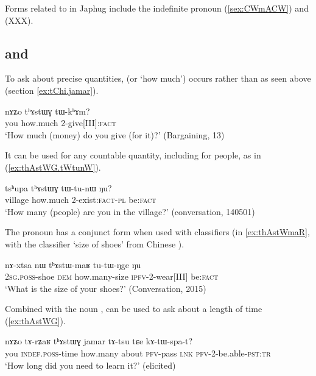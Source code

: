 Forms related to  in Japhug include the indefinite pronoun  (\ref{sex:CWmACW}) and  (XXX).

\subsection{ and } \label{sec:thAstWG}
To ask about precise quantities,  (or `how much') occurs rather than  as seen above (section \ref{ex:tChi.jamar}).

\begin{exe}
\ex \label{ex:thAstWG.tWkhAm}
 \gll    nɤʑo 	tʰɤstɯɣ 	tɯ-kʰɤm?    \\
 you how.much 2-give[III]:\textsc{fact}  \\
\glt  `How much (money) do you give (for it)?' (Bargaining, 13)
\end{exe} 

It can be used for any countable quantity, including for people, as in (\ref{ex:thAstWG.tWtunW}).

\begin{exe}
\ex \label{ex:thAstWG.tWtunW}
 \gll
tsʰupa tʰɤstɯɣ tɯ-tu-nɯ ŋu? \\
village how.much 2-exist:\textsc{fact}-\textsc{pl} be:\textsc{fact} \\
\glt `How many (people) are you in the village?' (conversation, 140501)
\end{exe} 

The pronoun  has a conjunct form  when used with classifiers (in \ref{ex:thAstWmaR}, with the classifier  `size of shoes' from Chinese  ).

 \begin{exe}
\ex \label{ex:thAstWmaR}
 \gll   nɤ-xtsa nɯ tʰɤstɯ-maʁ tu-tɯ-ŋge ŋu   \\
\textsc{2sg.poss}-shoe \textsc{dem} how.many-size \textsc{ipfv}-2-wear[III] be:\textsc{fact} \\ 
\glt `What is the size of your shoes?'  (Conversation, 2015)
\end{exe} 

Combined with the noun , 	 can be used to ask about a length of time (\ref{ex:thAstWG}).

\begin{exe}
\ex \label{ex:thAstWG}
 \gll   nɤʑo 	tɤ-rʑaʁ 	tʰɤstɯɣ 	jamar 	tɤ-tsu tɕe 	kɤ-tɯ-spa-t?  \\
 you \textsc{indef.poss}-time how.many about \textsc{pfv}-pass \textsc{lnk} \textsc{pfv}-2-be.able-\textsc{pst:tr} \\
\glt   `How long did you need to learn it?' (elicited)
\end{exe} 

